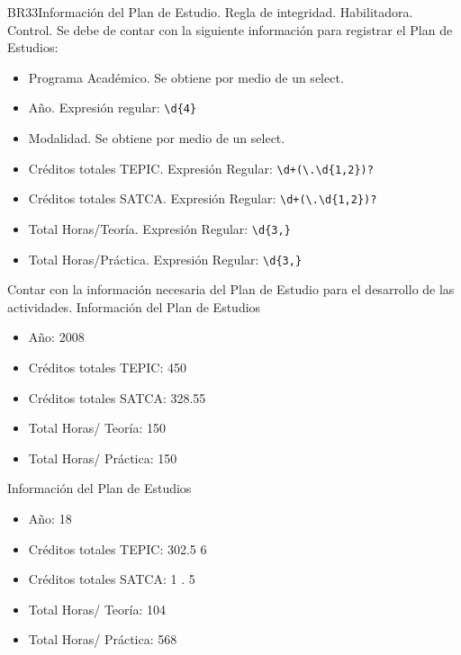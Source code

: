 \begin{BussinesRule}{BR33}{Información del Plan de Estudio.}
	\BRitem[Tipo:] Regla de integridad.
	\BRitem[Clase:] Habilitadora.
	\BRitem[Nivel:] Control.
	\BRitem[Descripción:]Se debe de contar con la siguiente información para registrar el Plan de Estudios:
	\begin{itemize}
		\item Programa Académico. Se obtiene por medio de un select.
		\item Año. Expresión regular: \verb|\d{4}|
		\item Modalidad. Se obtiene por medio de un select.
		\item Créditos totales TEPIC. Expresión Regular: \verb|\d+(\.\d{1,2})?|
		\item Créditos totales SATCA. Expresión Regular: \verb|\d+(\.\d{1,2})?|
		\item Total Horas/Teoría. Expresión Regular: \verb|\d{3,}|
		\item Total Horas/Práctica. Expresión Regular: \verb|\d{3,}|
	\end{itemize}
	\BRitem[Motivación:] Contar con la información necesaria del Plan de Estudio para el desarrollo de las actividades.
	 Información del Plan de Estudios
	\begin{itemize}
		\item Año: 2008
		\item Créditos totales TEPIC: 450
		\item Créditos totales SATCA: 328.55
		\item Total Horas/ Teoría: 150
		\item Total Horas/ Práctica: 150
	\end{itemize}
	 Información del Plan de Estudios
	\begin{itemize}
		\item Año: 18
		\item Créditos totales TEPIC: 302.5 6
		\item Créditos totales SATCA: 1 . 5
		\item Total Horas/ Teoría: 104
		\item Total Horas/ Práctica: 568
	\end{itemize}
\end{BussinesRule}
